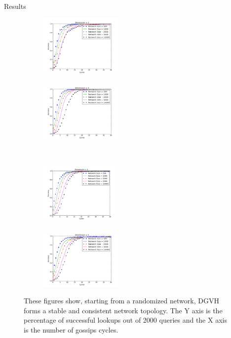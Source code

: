 \documentclass[8pt]{beamer}
\begin{document}
\begin{frame}{Results}
\begin{figure}
 	\label{fig:conv}
 		\begin{subfigure}[b]{.45\linewidth}
 			\centering
 			\includegraphics[height=3cm]{conv_d2}
 			\label{conv2}
 		\end{subfigure} 
 		\begin{subfigure}[b]{.45\linewidth}
 			\centering
 			\includegraphics[height=3cm]{conv_d3}
 			\label{conv3}
 		\end{subfigure}\\
 		\begin{subfigure}[b]{.45\linewidth}
 		\centering
 			\includegraphics[height=3cm]{conv_d4}
 			\label{conv4}
 		\end{subfigure}
 		\begin{subfigure}[b]{.45\linewidth}
 			\centering
 			\includegraphics[height=3cm]{conv_d5}
 			\label{conv5}
 		\end{subfigure}
 		
 	\caption{These figures show, starting from a randomized network, DGVH forms a stable and consistent network topology.
 		The Y axis is the percentage of successful lookups out of 2000 queries and the X axis is the number of gossips cycles.}
 	
 \end{figure}
	


\end{frame}	
\end{document}
